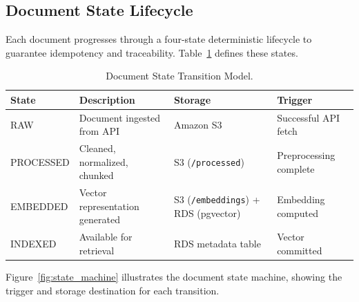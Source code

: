 \subsection{Document State Lifecycle}

Each document progresses through a four-state deterministic lifecycle to guarantee idempotency and traceability. Table~\ref{tab:doc_states} defines these states.

\begin{table}[H]
\caption{Document State Transition Model.}
\label{tab:doc_states}
\centering
\begin{tabular}{p{2.0cm}p{3.8cm}p{3.0cm}p{3.0cm}}
\toprule
\textbf{State} & \textbf{Description} & \textbf{Storage} & \textbf{Trigger} \\
\midrule
RAW & Document ingested from API & Amazon S3 & Successful API fetch \\
PROCESSED & Cleaned, normalized, chunked & S3 (\texttt{/processed}) & Preprocessing complete \\
EMBEDDED & Vector representation generated & S3 (\texttt{/embeddings}) + RDS (pgvector) & Embedding computed \\
INDEXED & Available for retrieval & RDS metadata table & Vector committed \\
\bottomrule
\end{tabular}
\end{table}

Figure~\ref{fig:state_machine} illustrates the document state machine, showing the trigger and storage destination for each transition.

